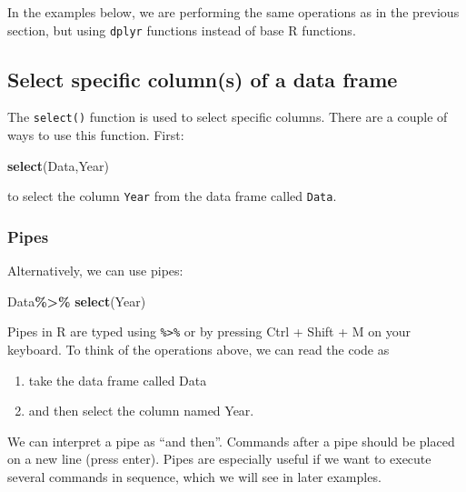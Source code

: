 \documentclass[
]{book}
\newenvironment{Shaded}{\begin{snugshade}}{\end{snugshade}}
\newcommand{\FunctionTok}[1]{\textcolor[rgb]{0.13,0.29,0.53}{\textbf{#1}}}
\newcommand{\NormalTok}[1]{#1}
\newcommand{\SpecialCharTok}[1]{\textcolor[rgb]{0.81,0.36,0.00}{\textbf{#1}}}
\providecommand{\tightlist}{%
  \setlength{\itemsep}{0pt}\setlength{\parskip}{0pt}}
\begin{document}
In the examples below, we are performing the same operations as in the previous section, but using \texttt{dplyr} functions instead of base R functions.

\hypertarget{select-specific-columns-of-a-data-frame}{%
\subsection{Select specific column(s) of a data frame}\label{select-specific-columns-of-a-data-frame}}

The \texttt{select()} function is used to select specific columns. There are a couple of ways to use this function. First:

\begin{Shaded}
\begin{Highlighting}[]
\FunctionTok{select}\NormalTok{(Data,Year)}
\end{Highlighting}
\end{Shaded}

to select the column \texttt{Year} from the data frame called \texttt{Data}.

\hypertarget{pipes}{%
\subsubsection{Pipes}\label{pipes}}

Alternatively, we can use pipes:

\begin{Shaded}
\begin{Highlighting}[]
\NormalTok{Data}\SpecialCharTok{\%\textgreater{}\%}
  \FunctionTok{select}\NormalTok{(Year)}
\end{Highlighting}
\end{Shaded}

Pipes in R are typed using \texttt{\%\textgreater{}\%} or by pressing Ctrl + Shift + M on your keyboard. To think of the operations above, we can read the code as

\begin{enumerate}
\def\labelenumi{\arabic{enumi}.}
\tightlist
\item
  take the data frame called Data
\item
  and then select the column named Year.
\end{enumerate}

We can interpret a pipe as ``and then''. Commands after a pipe should be placed on a new line (press enter). Pipes are especially useful if we want to execute several commands in sequence, which we will see in later examples.
\end{document}
